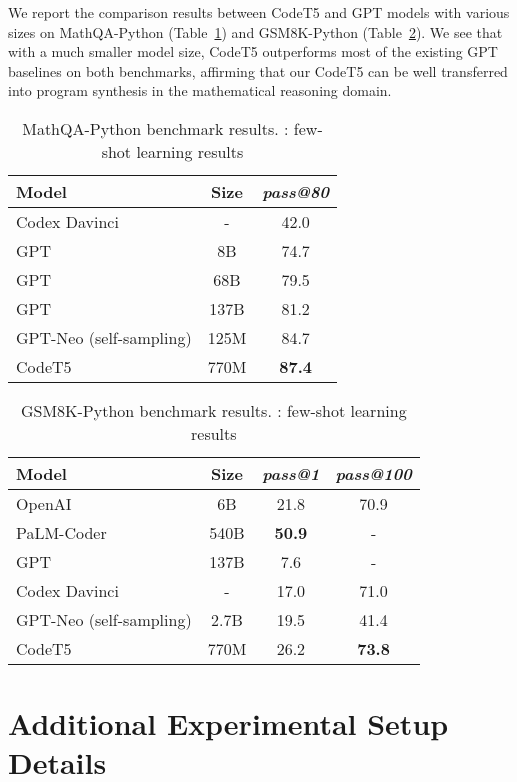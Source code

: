 \documentclass{article}
\begin{document}
We report the comparison results between CodeT5 and GPT models with various sizes  on  MathQA-Python (Table~\ref{tab:codet5_mathqa}) and GSM8K-Python (Table~\ref{tab:codet5_gsm}). We see that with a much smaller model size, CodeT5 outperforms most of the existing GPT baselines on both benchmarks, affirming that our CodeT5 can be well transferred into program synthesis in the mathematical reasoning domain.
\begin{table}[t] \centering
\caption{MathQA-Python benchmark results. : few-shot learning results}
\label{tab:codet5_mathqa}
\begin{tabular}{lc|c}
\hline
Model & Size & \emph{pass@80} \\
\hline
Codex Davinci  & - & 42.0 \\
GPT & 8B & 74.7 \\
GPT & 68B & 79.5 \\
GPT & 137B & 81.2 \\
GPT-Neo (self-sampling) & 125M & 84.7 \\
\hline
CodeT5 & 770M & \textbf{87.4} \\
\hline
\end{tabular}
\end{table} \begin{table}[t] \centering
\caption{GSM8K-Python benchmark results. : few-shot learning results}
\label{tab:codet5_gsm}
\begin{tabular}{lc|cc}
\hline
Model & Size & \emph{pass@1} & \emph{pass@100} \\
\hline
OpenAI & 6B & 21.8 & 70.9 \\
PaLM-Coder & 540B & \textbf{50.9} & - \\
GPT & 137B & 7.6 & - \\
Codex Davinci  & - & 17.0 & 71.0 \\
GPT-Neo (self-sampling) & 2.7B & 19.5 & 41.4 \\
\hline
CodeT5 & 770M & 26.2 & \textbf{73.8} \\
\hline
\end{tabular}
\end{table} \fi

\iffalse

\section{Additional Experimental Setup Details}
\label{app:training_info}
\end{document}
